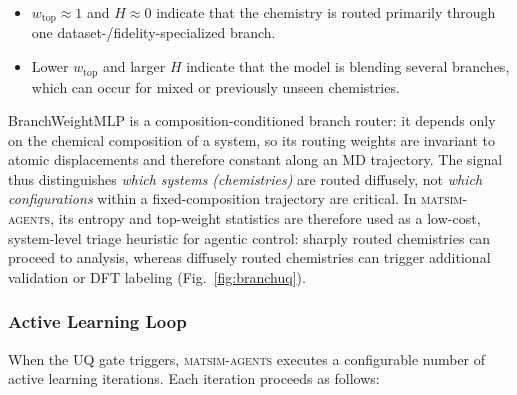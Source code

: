 \documentclass[conference]{IEEEtran}
\def\ac#1{#1}%
\def\acs#1{#1}%
\begin{document}
\begin{itemize}
\item $w_\text{top} \approx 1$ and $H \approx 0$ indicate that the chemistry is
  routed primarily through one dataset-/fidelity-specialized branch.
\item Lower $w_\text{top}$ and larger $H$ indicate that the model is blending
  several branches, which can occur for mixed or previously unseen chemistries.
\end{itemize}

BranchWeightMLP is a composition-conditioned branch router: it depends only on the chemical
composition of a system, so its routing weights are invariant to atomic
displacements and therefore constant along an \ac{MD} trajectory. The signal
thus distinguishes \emph{which systems (chemistries)} are routed diffusely, not
\emph{which configurations} within a fixed-composition trajectory are critical.
In \textsc{matsim-agents}, its entropy and top-weight statistics are therefore
used as a low-cost, system-level triage heuristic for agentic control: sharply
routed chemistries can proceed to analysis, whereas diffusely routed
chemistries can trigger additional validation or \acs{DFT} labeling
(Fig.~\ref{fig:branchuq}).

\subsubsection{Active Learning Loop}
When the \acs{UQ} gate triggers, \textsc{matsim-agents} executes a configurable
number of active learning iterations. Each iteration proceeds as follows:
\end{document}
